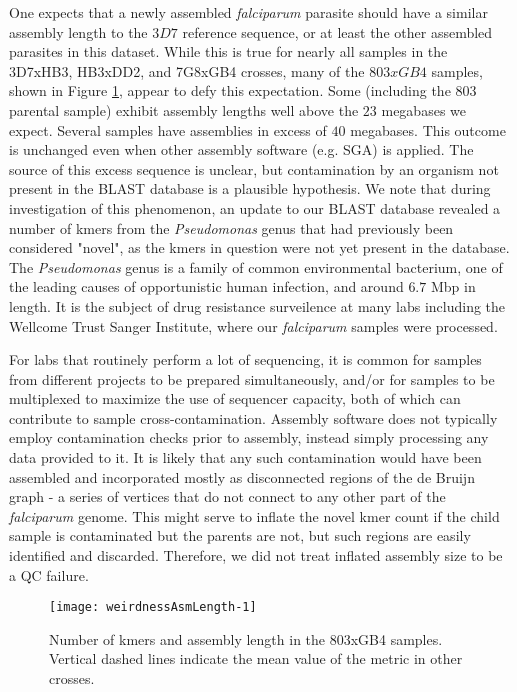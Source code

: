 One expects that a newly assembled \textit{falciparum} parasite should have a similar assembly length to the $3D7$ reference sequence, or at least the other assembled parasites in this dataset.  While this is true for nearly all samples in the 3D7xHB3, HB3xDD2, and 7G8xGB4 crosses, many of the $803xGB4$ samples, shown in Figure \ref{fig:weirdnessAsmLength}, appear to defy this expectation.  Some (including the $803$ parental sample) exhibit assembly lengths well above the $23$ megabases we expect.  Several samples have assemblies in excess of $40$ megabases.  This outcome is unchanged even when other assembly software (e.g. SGA) is applied.  The source of this excess sequence is unclear, but contamination by an organism not present in the BLAST database is a plausible hypothesis.  We note that during investigation of this phenomenon, an update to our BLAST database revealed a number of kmers from the \textit{Pseudomonas} genus that had previously been considered "novel", as the kmers in question were not yet present in the database.  The \textit{Pseudomonas} genus is a family of common environmental bacterium, one of the leading causes of opportunistic human infection\cite{Stover:2000dy}, and around $6.7$ Mbp in length.  It is the subject of drug resistance surveilence\cite{Winsor:2016ca} at many labs including the Wellcome Trust Sanger Institute, where our \textit{falciparum} samples were processed.

For labs that routinely perform a lot of sequencing, it is common for samples from different projects to be prepared simultaneously, and/or for samples to be multiplexed to maximize the use of sequencer capacity, both of which can contribute to sample cross-contamination\cite{Jun:2012je}.  Assembly software does not typically employ contamination checks prior to assembly, instead simply processing any data provided to it.  It is likely that any such contamination would have been assembled and incorporated mostly as disconnected regions of the de Bruijn graph - a series of vertices that do not connect to any other part of the \textit{falciparum} genome.  This might serve to inflate the novel kmer count if the child sample is contaminated but the parents are not, but such regions are easily identified and discarded.  Therefore, we did not treat inflated assembly size to be a QC failure.

\begin{figure}[h!]
  \centering
    \texttt{[image: weirdnessAsmLength-1]}
  \caption{Number of kmers and assembly length in the 803xGB4 samples.  Vertical dashed lines indicate the mean value of the metric in other crosses.}
  \label{fig:weirdnessAsmLength}
\end{figure}


